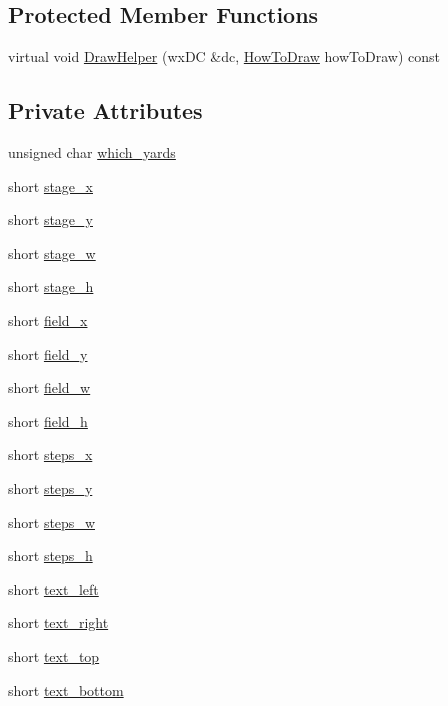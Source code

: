 \subsection*{Protected Member Functions}
\begin{DoxyCompactItemize}
\item 
virtual void \hyperlink{a00142_a1b230ce66e25eff2d75b25aa8487f5bc}{Draw\-Helper} (wx\-D\-C \&dc, \hyperlink{a00140_ad4ba026a6f87cccc7b00eae19c55bd87}{How\-To\-Draw} how\-To\-Draw) const 
\end{DoxyCompactItemize}
\subsection*{Private Attributes}
\begin{DoxyCompactItemize}
\item 
unsigned char \hyperlink{a00142_a2a1927c272421dde7b5b089705c20af2}{which\-\_\-yards}
\item 
short \hyperlink{a00142_ae92323eacb43cd318f8e04095712088f}{stage\-\_\-x}
\item 
short \hyperlink{a00142_a4a1a127106cb904db472060863459149}{stage\-\_\-y}
\item 
short \hyperlink{a00142_a5e2caf6708818dd626e2b726a518923c}{stage\-\_\-w}
\item 
short \hyperlink{a00142_a13830537d12e52589b1d1d7e0f3ccacf}{stage\-\_\-h}
\item 
short \hyperlink{a00142_ac47d2422ebc0158e72f565550cd5df2f}{field\-\_\-x}
\item 
short \hyperlink{a00142_a7f3b04b32b4ffce61e6e387ccb97032e}{field\-\_\-y}
\item 
short \hyperlink{a00142_a6a561d1254559d1ce204fac4d14f5567}{field\-\_\-w}
\item 
short \hyperlink{a00142_a8a1e0ed43814622ba74cc1f8c94db4a6}{field\-\_\-h}
\item 
short \hyperlink{a00142_aa0b3e40ff22b63f642602f9192bed6ab}{steps\-\_\-x}
\item 
short \hyperlink{a00142_a794bc3c909f4bdbd5f291211aa1e77f7}{steps\-\_\-y}
\item 
short \hyperlink{a00142_a6b20769831071a036065b088e70ca662}{steps\-\_\-w}
\item 
short \hyperlink{a00142_a52614c04f979adae9249769ae94e2653}{steps\-\_\-h}
\item 
short \hyperlink{a00142_ab6c4d816f180a47ef457c343aee27f04}{text\-\_\-left}
\item 
short \hyperlink{a00142_aad536ebe795a3e73d01f8e722da91957}{text\-\_\-right}
\item 
short \hyperlink{a00142_aef41c2f441e593e56cc86766d02530eb}{text\-\_\-top}
\item 
short \hyperlink{a00142_ac8bb365bfdc569bcc74dd55e3e0a27d8}{text\-\_\-bottom}
\end{DoxyCompactItemize}
